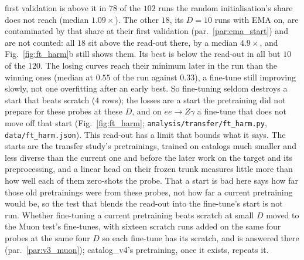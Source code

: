 \documentclass[11pt]{article}
\newcommand{\code}[1]{\texttt{#1}}
\begin{document}
first validation is above it in $78$ of the $102$ runs the random initialisation's share does not reach (median
$1.09\times$). The other $18$, its $D=10$ runs with EMA on, are contaminated by that share at their first validation
(par.~\ref{par:ema_start}) and are not counted: all $18$ sit above the read-out there, by a median $4.9\times$, and
Fig.~\ref{fig:ft_harm}b still shows them. Its best is below the read-out in all but $10$ of the $120$.
The losing curves reach their minimum later in the run than the winning ones (median at $0.55$ of the run against
$0.33$), a fine-tune still improving slowly, not one overfitting after an early best. So fine-tuning seldom destroys
a start that beats scratch ($4$ rows); the losses are a start the pretraining did not prepare for these probes at these
$D$, and on $ee\to Z\gamma$ a fine-tune that does not move off that start (Fig.~\ref{fig:ft_harm};
\code{analysis/transfer/ft\_harm.py}, \code{data/ft\_harm.json}).
This read-out has a limit that bounds what it says. The starts are the transfer study's pretrainings, trained on
catalogs much smaller and less diverse than the current one and before the later work on the target and its
preprocessing, and a linear head on their frozen trunk measures little more than how well each of them zero-shots the
probe. That a start is bad here says how far those old pretrainings were from these probes, not how far a current
pretraining would be, so the test that blends the read-out into the fine-tune's start is not run. Whether fine-tuning a
current pretraining beats scratch at small $D$ moved to the Muon test's fine-tunes, with sixteen scratch runs added
on the same four probes at the same four $D$ so each fine-tune has its scratch, and is answered there
(par.~\ref{par:v3_muon}); catalog\_v4's pretraining, once it exists, repeats it.
\end{document}
